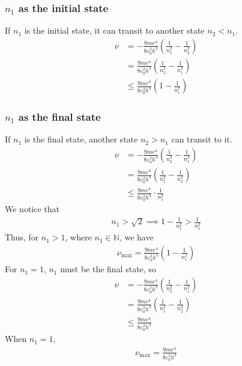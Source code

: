 \documentclass[12pt]{book} %
\numberwithin{equation}{chapter}
\def\N{\mathbb{N}}
\def\e{\varepsilon}
\begin{document}
\begin{solbox}
\subsubsection{$n_{1}$ as the initial state}
If $n_{1}$ is the initial state, it can transit to another state $n_{2}<n_{1}$.
\begin{align*}
\nu&=-\frac{9me^{4}}{8\e_{0}^{2}h^{3}}\left(\frac{1}{n_{1}^{2}}-\frac{1}{n_{2}^{2}}\right)\\
&=\frac{9me^{4}}{8\e_{0}^{2}h^{3}}\left(\frac{1}{n_{2}^{2}}-\frac{1}{n_{1}^{2}}\right)\\
&\leq \frac{9me^{4}}{8\e_{0}^{2}h^{3}}\left(1-\frac{1}{n_{1}^{2}}\right)
\end{align*}

\subsubsection{$n_{1}$ as the final state}
If $n_{1}$ is the final state, another state $n_{2}>n_{1}$ can transit to it.
\begin{align*}
\nu&=-\frac{9me^{4}}{8\e_{0}^{2}h^{3}}\left(\frac{1}{n_{2}^{2}}-\frac{1}{n_{1}^{2}}\right)\\
&=\frac{9me^{4}}{8\e_{0}^{2}h^{3}}\left(\frac{1}{n_{1}^{2}}-\frac{1}{n_{2}^{2}}\right)\\
&\leq \frac{9me^{4}}{8\e_{0}^{2}h^{3}}\cdot\frac{1}{n_{1}^{2}}
\end{align*}
We notice that
\begin{align*}
n_{1}>\sqrt{2}\implies 1-\frac{1}{n_{1}^{2}}>\frac{1}{n_{1}^{2}}
\end{align*}
Thus, for $n_{1}>1$, where $n_{1}\in\N$, we have
\begin{align*}
\nu_{\text{max}}=\frac{9me^{4}}{8\e_{0}^{2}h^{3}}\left(1-\frac{1}{n_{1}^{2}}\right)
\end{align*}
For $n_{1}=1$, $n_{1}$ must be the final state, so
\begin{align*}
\nu&=-\frac{9me^{4}}{8\e_{0}^{2}h^{3}}\left(\frac{1}{n_{2}^{2}}-\frac{1}{n_{1}^{2}}\right)\\
&=\frac{9me^{4}}{8\e_{0}^{2}h^{3}}\left(\frac{1}{n_{1}^{2}}-\frac{1}{n_{2}^{2}}\right)\\
&\leq \frac{9me^{4}}{8\e_{0}^{2}h^{3}}
\end{align*}
When $n_{1}=1$,
\begin{align*}
\nu_{\text{max}}=\frac{9me^{4}}{8\e_{0}^{2}h^{3}}
\end{align*}
\end{solbox}
\end{document}

